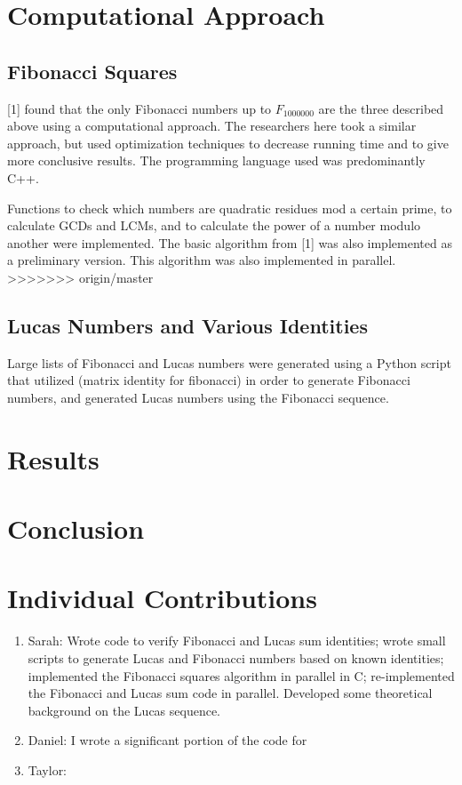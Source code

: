 \documentclass[11pt]{article}
\begin{document}
\section{Computational Approach}
\subsection{Fibonacci Squares}
[1] found that the only Fibonacci numbers up to $F_{1000000}$ are the three described above using a computational approach. The researchers here took a similar approach, but used optimization techniques to decrease running time and to give more conclusive results. The programming language used was predominantly C++.

Functions to check which numbers are quadratic residues mod a certain prime, to calculate GCDs and LCMs, and to calculate the power of a number modulo another were implemented. The basic algorithm from [1] was also implemented as a preliminary version. This algorithm was also implemented in parallel.
>>>>>>> origin/master

\subsection{Lucas Numbers and Various Identities}
Large lists of Fibonacci and Lucas numbers were generated using a Python script that utilized (matrix identity for fibonacci) in order to generate Fibonacci numbers, and generated Lucas numbers using the Fibonacci sequence. 


\section{Results}



\section{Conclusion}



\section{Individual Contributions}

\begin{enumerate}
\item Sarah: Wrote code to verify Fibonacci and Lucas sum identities; wrote small scripts to generate Lucas and Fibonacci numbers based on known identities; implemented the Fibonacci squares algorithm in parallel in C; re-implemented the Fibonacci and Lucas sum code in parallel. Developed some theoretical background on the Lucas sequence.

\item Daniel: I wrote a significant portion of the code for 

\item Taylor:
\end{enumerate}
\end{document}
